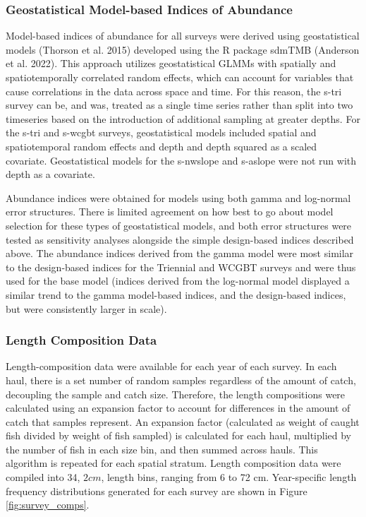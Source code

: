 \documentclass[11pt,
  english,
  letterpaper,
]{article}
\begin{document}
\hypertarget{geostatistical-model-based-indices-of-abundance}{%
\subsubsection{Geostatistical Model-based Indices of Abundance}\label{geostatistical-model-based-indices-of-abundance}}

Model-based indices of abundance for all surveys were derived using geostatistical models (Thorson et al. 2015) developed using the R package sdmTMB (Anderson et al. 2022). This approach utilizes geostatistical GLMMs with spatially and spatiotemporally correlated random effects, which can account for variables that cause correlations in the data across space and time. For this reason, the \gls{s-tri} survey can be, and was, treated as a single time series rather than split into two timeseries based on the introduction of additional sampling at greater depths. For the \gls{s-tri} and \gls{s-wcgbt} surveys, geostatistical models included spatial and spatiotemporal random effects and depth and depth squared as a scaled covariate. Geostatistical models for the \gls{s-nwslope} and \gls{s-aslope} were not run with depth as a covariate.

Abundance indices were obtained for models using both gamma and log-normal error structures. There is limited agreement on how best to go about model selection for these types of geostatistical models, and both error structures were tested as sensitivity analyses alongside the simple design-based indices described above. The abundance indices derived from the gamma model were most similar to the design-based indices for the Triennial and WCGBT surveys and were thus used for the base model (indices derived from the log-normal model displayed a similar trend to the gamma model-based indices, and the design-based indices, but were consistently larger in scale).

\hypertarget{length-composition-data}{%
\subsubsection{Length Composition Data}\label{length-composition-data}}

Length-composition data were available for each year of each survey. In each haul, there is a set number of random samples regardless of the amount of catch, decoupling the sample and catch size. Therefore, the length compositions were calculated using an expansion factor to account for differences in the amount of catch that samples represent. An expansion factor (calculated as weight of caught fish divided by weight of fish sampled) is calculated for each haul, multiplied by the number of fish in each size bin, and then summed across hauls. This algorithm is repeated for each spatial stratum. Length composition data were compiled into 34, \(2 cm\), length bins, ranging from 6 to 72 cm. Year-specific length frequency distributions generated for each survey are shown in Figure \ref{fig:survey_comps}.
\end{document}
